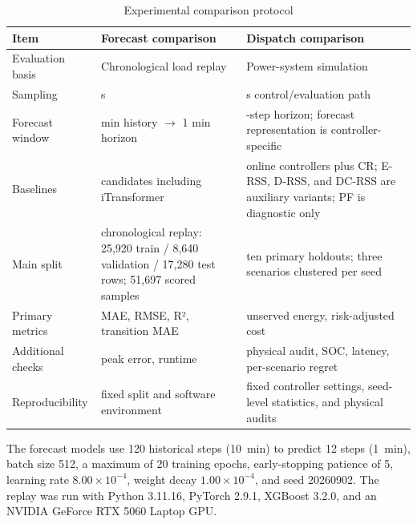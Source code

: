 \begin{table}[!t]
\caption{Experimental comparison protocol}
\label{tab:experimental-protocol}
\centering
\footnotesize
\begin{tabular}{@{}
  >{\raggedright\arraybackslash}p{}
  >{\raggedright\arraybackslash}p{}
  >{\raggedright\arraybackslash}p{}@{}}
\toprule
\begin{minipage}[b]{\linewidth}\raggedright
Item
\end{minipage} & \begin{minipage}[b]{\linewidth}\raggedright
Forecast comparison
\end{minipage} & \begin{minipage}[b]{\linewidth}\raggedright
Dispatch comparison
\end{minipage} \\
\midrule
Evaluation basis & Chronological load replay & Power-system simulation \\
Sampling & 5 s & 5 s control/evaluation path \\
Forecast window & 10 min history $\rightarrow$ 1 min horizon & 12-step horizon;
forecast representation is controller-specific \\
Baselines & 11 candidates including iTransformer & 7 online controllers plus
CR; E-RSS, D-RSS, and DC-RSS are auxiliary variants; PF is diagnostic only \\
Main split & chronological replay: 25,920 train / 8,640 validation / 17,280 test rows; 51,697 scored samples & ten primary holdouts; three scenarios clustered per seed \\
Primary metrics & MAE, RMSE, R², transition MAE & unserved energy,
risk-adjusted cost \\
Additional checks & peak error, runtime & physical audit, SOC, latency,
per-scenario regret \\
Reproducibility & fixed split and software environment & fixed controller
settings, seed-level statistics, and physical audits \\
\bottomrule
\end{tabular}
\end{table}

The forecast models use 120 historical steps (10~min) to predict 12 steps
(1~min), batch size 512, a maximum of 20 training epochs, early-stopping
patience of 5, learning rate $8.00\times10^{-4}$, weight decay
$1.00\times10^{-4}$, and seed
20260902. The replay was run with Python 3.11.16, PyTorch 2.9.1, XGBoost
3.2.0, and an NVIDIA GeForce RTX 5060 Laptop GPU.

